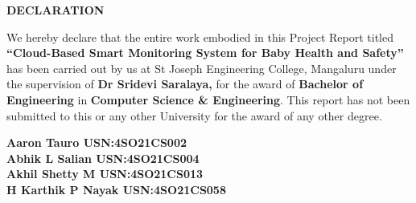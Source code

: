 \documentclass[12pt,a4paper]{report}
\begin{document}
\begin{center}
    {\Large \textbf{DECLARATION}}
\end{center}
\justifying
\par
{}
\noindent We hereby declare that the entire work embodied in this Project Report titled
\textbf{``Cloud-Based Smart Monitoring System for Baby Health and Safety''} has been carried out by us at St Joseph Engineering College, Mangaluru under the supervision of \textbf{Dr Sridevi Saralaya,} for the award of \textbf{Bachelor of Engineering} in \textbf{Computer Science \& Engineering}. This report has not been submitted to this or any other University  for the award of any  other degree. \\
\vspace{0.25in}


\begin{flushleft}
\textbf{Aaron Tauro  USN:4SO21CS002}\\
\vspace{0.1in}
\textbf{Abhik L Salian  USN:4SO21CS004}\\
\vspace{0.1in}
\textbf{Akhil Shetty M  USN:4SO21CS013}\\
\vspace{0.1in}
\textbf{H Karthik P Nayak  USN:4SO21CS058}\\
\end{flushleft}

{}
\end{document}
